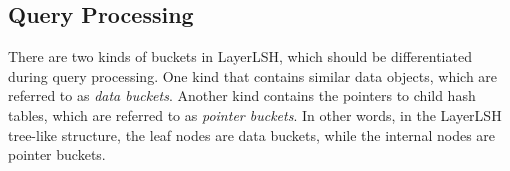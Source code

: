 \subsection{Query Processing}
\label{sec:layerlsh:query}

There are two kinds of buckets in LayerLSH, which should be differentiated during query processing. One kind that contains similar data objects, which are referred to as \emph{data buckets}. Another kind contains the pointers to child hash tables, which are referred to as \emph{pointer buckets}. In other words, in the LayerLSH tree-like structure, the leaf nodes are data buckets, while the internal nodes are pointer buckets.

